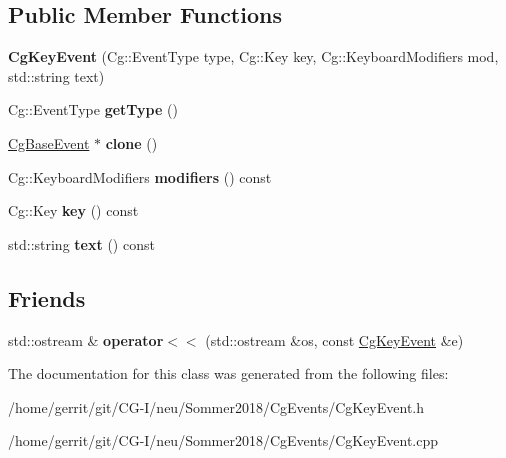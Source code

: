 \subsection*{Public Member Functions}
\begin{DoxyCompactItemize}
\item 
\mbox{\label{class_cg_key_event_a6f0319a9202a3d17d5eeb024102f94bf}} 
{\bfseries Cg\+Key\+Event} (Cg\+::\+Event\+Type type, Cg\+::\+Key key, Cg\+::\+Keyboard\+Modifiers mod, std\+::string text)
\item 
\mbox{\label{class_cg_key_event_a0d5c82654532b88c730c41df9be8b6a2}} 
Cg\+::\+Event\+Type {\bfseries get\+Type} ()
\item 
\mbox{\label{class_cg_key_event_abd2ee619c86e29add74bc77dcc3224ab}} 
\hyperlink{class_cg_base_event}{Cg\+Base\+Event} $\ast$ {\bfseries clone} ()
\item 
\mbox{\label{class_cg_key_event_aabfa4eef4fcd87d87ffc6e3d213f8485}} 
Cg\+::\+Keyboard\+Modifiers {\bfseries modifiers} () const
\item 
\mbox{\label{class_cg_key_event_a6891a839defce28fe447e59494374f6a}} 
Cg\+::\+Key {\bfseries key} () const
\item 
\mbox{\label{class_cg_key_event_a80cb3adad96db712f4934d184a86aad1}} 
std\+::string {\bfseries text} () const
\end{DoxyCompactItemize}
\subsection*{Friends}
\begin{DoxyCompactItemize}
\item 
\mbox{\label{class_cg_key_event_ad8e295b72963ff6e02ac5fb50174b5f5}} 
std\+::ostream \& {\bfseries operator$<$$<$} (std\+::ostream \&os, const \hyperlink{class_cg_key_event}{Cg\+Key\+Event} \&e)
\end{DoxyCompactItemize}


The documentation for this class was generated from the following files\+:\begin{DoxyCompactItemize}
\item 
/home/gerrit/git/\+C\+G-\/\+I/neu/\+Sommer2018/\+Cg\+Events/Cg\+Key\+Event.\+h\item 
/home/gerrit/git/\+C\+G-\/\+I/neu/\+Sommer2018/\+Cg\+Events/Cg\+Key\+Event.\+cpp\end{DoxyCompactItemize}
